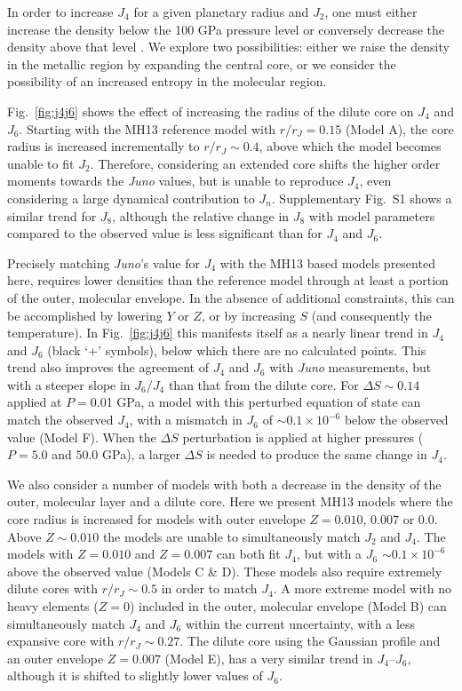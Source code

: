 In order to increase $J_4$ for a given planetary radius and $J_2$,  
one must either increase the density below the 100 GPa pressure level or
conversely decrease the density above that level \citep[][their
Fig.~5]{Guillot1999}. We explore two possibilities: either we raise the density
in the metallic region by expanding the central core, or we consider the
possibility of an increased entropy in the molecular region.

Fig.~\ref{fig:j4j6} shows the effect of increasing the radius of the dilute
core on $J_4$ and $J_6$. Starting with the MH13 reference model with
$r/r_J=0.15$ (Model A), the core radius is increased incrementally to
$r/r_J\sim0.4$, above which the model becomes unable to fit $J_2$.  Therefore,
considering an extended core shifts the higher order moments towards the
\textit{Juno} values, but is unable to reproduce $J_4$, even considering a
large dynamical contribution to $J_n$.  Supplementary Fig.~S1 shows a similar
trend for $J_8$, although the relative change in $J_8$ with model parameters
compared to the observed value is less significant than for $J_4$ and $J_6$. 

Precisely matching \textit{Juno}'s value for $J_4$ with the MH13 based models
presented here, requires lower densities than the reference model through at
least a portion of the outer, molecular envelope. In the absence of additional
constraints, this can be accomplished by lowering $Y$ or $Z$, or by increasing
$S$ (and consequently the temperature). In Fig.~\ref{fig:j4j6} this manifests
itself as a nearly linear trend in $J_4$ and $J_6$ (black `+' symbols), below
which there are no calculated points.  This trend also improves the agreement
of $J_4$ and $J_6$ with \textit{Juno} measurements, but with a steeper slope in
$J_6/J_4$ than that from the dilute core.  For $\Delta S\sim0.14$ applied at
$P=$0.01 GPa, a model with this perturbed equation of state can match the
observed $J_4$, with a mismatch in  $J_6$ of $\sim0.1\times10^{-6}$ below the
observed value (Model F).  When the $\Delta S$ perturbation is applied at
higher pressures ($P=5.0$ and $50.0$ GPa), a larger $\Delta S$ is needed to
produce the same change in $J_4$.

We also consider a number of models with both a decrease in the density of the outer,
molecular layer and a dilute core. Here we present MH13 models where the core
radius is increased for models with outer envelope $Z=0.010$, $0.007$ or $0.0$.
Above $Z\sim0.010$ the models are unable to simultaneously match $J_2$ and $J_4$. The
models with $Z=0.010$ and $Z=0.007$ can both fit $J_4$, but with a $J_6$ 
$\sim0.1\times 10^{-6}$ above the observed value (Models C \& D). These models also
require extremely dilute cores with $r/r_J\sim0.5$ in order to match $J_4$. A more
extreme model with no heavy elements ($Z=0$) included in the outer, molecular
envelope (Model B) can simultaneously match $J_4$ and $J_6$ within the current
uncertainty, with a less expansive core with $r/r_J\sim0.27$. The dilute
core using the Gaussian profile and an outer envelope $Z=0.007$ (Model E), has a very similar
trend in $J_4$--$J_6$, although it is shifted to slightly lower values of $J_6$.


